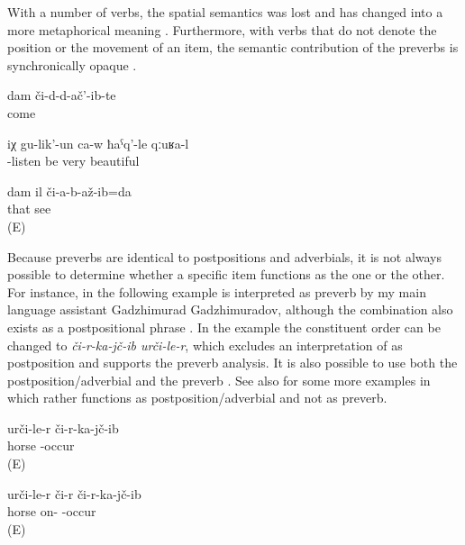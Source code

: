 With a number of verbs, the spatial semantics was lost and has changed into a more metaphorical meaning . Furthermore, with verbs that do not denote the position or the movement of an item, the semantic contribution of the preverbs is synchronically opaque \xxref{ex:He is listening carefully to him verbs@3}{ex:I did not see it. [There is no lock}.
%
\begin{exe}
	\ex	\label{ex:(It is enough what) I experienced verbs@2}
	\gll	dam	či-d-d-ač'-ib-te\\
			come\\
	\glt	{}

	\ex	\label{ex:He is listening carefully to him verbs@3}
	\gll	iχ	gu-lik'-un	ca-w	ħaˁq'-le	qːuʁa-l\\
			-listen	be	very	beautiful\\
	\glt	{}

	\ex	\label{ex:I did not see it. [There is no lock}
	\gll	dam	il	či-a-b-až-ib=da\\
			that	see\\
	\glt	{} (E)
\end{exe}

Because preverbs are identical to postpositions and adverbials, it is not always possible to determine whether a specific item functions as the one or the other. For instance,  in the following example  is interpreted as preverb by my main language assistant Gadzhimurad Gadzhimuradov, although the combination  also exists as a postpositional phrase . In the example  the constituent order can be changed to \textit{či-r-ka-jč-ib urči-le-r}, which excludes an interpretation of  as postposition and supports the preverb analysis. It is also possible to use both the postposition/adverbial and the preverb . See also  for some more examples in which  rather functions as postposition/adverbial and not as preverb.
%
\begin{exe}
	\ex	\label{ex:He fell from the horse verbs}
	\gll	urči-le-r	či-r-ka-jč-ib\\
		horse	-occur\\
	\glt	{} (E)
	
		\ex	\label{ex:He fell from the horse verbs_1}
	\gll	urči-le-r či-r	či-r-ka-jč-ib\\
		horse on- -occur\\
	\glt	{} (E)
	
\end{exe}

